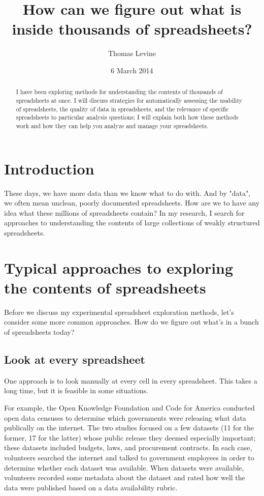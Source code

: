 \documentclass{acm_proc_article-sp}
\begin{document}
\title{How can we figure out what is inside thousands of spreadsheets?}
\author{ \alignauthor Thomas Levine\\  }
\date{6 March 2014}
\maketitle
\begin{abstract}
I have been exploring methods for understanding the contents
of thousands of spreadsheets at once. I will discuss strategies for automatically
assessing the usability of spreadsheets, the quality of data
in spreadsheets, and the relevance of specific spreadsheets to particular
analysis questions; I will explain both how these methods work and how they
can help you analyze and manage your spreadsheets.
\end{abstract}


\section{Introduction}
These days, we have more data than we know what to do with. And by "data",
we often mean unclean, poorly documented spreadsheets. How are we to have
any idea what these millions of spreadsheets contain? In my research,
I search for approaches to understanding the contents of large collections
of weakly structured spreadsheets.

\section{Typical approaches to exploring the contents of spreadsheets}
Before we discuss my experimental spreadsheet exploration methods,
let's consider some more common approaches.
How do we figure out what's in a bunch of spreadsheets today?

\subsection{Look at every spreadsheet}
One approach is to look manually at every cell in every spreadsheet.
This takes a long time, but it is feasible in some situations.

For example, the Open Knowledge Foundation \cite{open-data-census}
and Code for America \cite{open-data-census-us}
conducted open data censuses to determine which governments were
releasing what data publically on the internet. The two studies
focused on a few datasets (11 for the former, 17 for the latter)
whose public release they deemed especially important; these datasets
included budgets, laws, and procurement contracts.
In each case, volunteers searched the internet and talked to
government employees in order to determine whether each dataset was
available. When datasets were available, volunteers recorded some
metadata about the dataset and rated how well the data were published
based on a data availability rubric.
\end{document}
